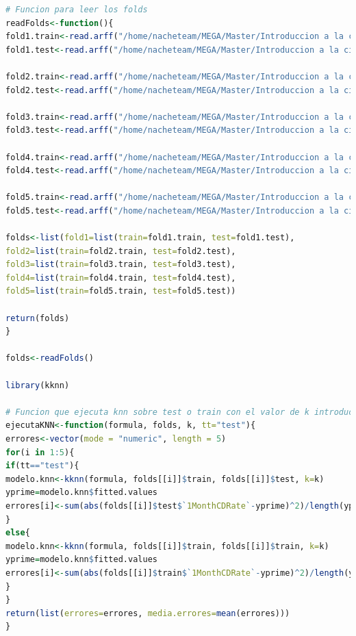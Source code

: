 \documentclass[12pt,a4paper]{article}
\begin{document}
\begin{lstlisting}[basicstyle=\tiny, language=R]
# Funcion para leer los folds
readFolds<-function(){
fold1.train<-read.arff("/home/nacheteam/MEGA/Master/Introduccion a la ciencia de datos/Trabajo Integrador/DATOS/Datasets Regresion/treasury/treasury-5-1tra.dat")
fold1.test<-read.arff("/home/nacheteam/MEGA/Master/Introduccion a la ciencia de datos/Trabajo Integrador/DATOS/Datasets Regresion/treasury/treasury-5-1tst.dat")

fold2.train<-read.arff("/home/nacheteam/MEGA/Master/Introduccion a la ciencia de datos/Trabajo Integrador/DATOS/Datasets Regresion/treasury/treasury-5-2tra.dat")
fold2.test<-read.arff("/home/nacheteam/MEGA/Master/Introduccion a la ciencia de datos/Trabajo Integrador/DATOS/Datasets Regresion/treasury/treasury-5-2tst.dat")

fold3.train<-read.arff("/home/nacheteam/MEGA/Master/Introduccion a la ciencia de datos/Trabajo Integrador/DATOS/Datasets Regresion/treasury/treasury-5-3tra.dat")
fold3.test<-read.arff("/home/nacheteam/MEGA/Master/Introduccion a la ciencia de datos/Trabajo Integrador/DATOS/Datasets Regresion/treasury/treasury-5-3tst.dat")

fold4.train<-read.arff("/home/nacheteam/MEGA/Master/Introduccion a la ciencia de datos/Trabajo Integrador/DATOS/Datasets Regresion/treasury/treasury-5-4tra.dat")
fold4.test<-read.arff("/home/nacheteam/MEGA/Master/Introduccion a la ciencia de datos/Trabajo Integrador/DATOS/Datasets Regresion/treasury/treasury-5-4tst.dat")

fold5.train<-read.arff("/home/nacheteam/MEGA/Master/Introduccion a la ciencia de datos/Trabajo Integrador/DATOS/Datasets Regresion/treasury/treasury-5-5tra.dat")
fold5.test<-read.arff("/home/nacheteam/MEGA/Master/Introduccion a la ciencia de datos/Trabajo Integrador/DATOS/Datasets Regresion/treasury/treasury-5-5tst.dat")

folds<-list(fold1=list(train=fold1.train, test=fold1.test),
fold2=list(train=fold2.train, test=fold2.test),
fold3=list(train=fold3.train, test=fold3.test),
fold4=list(train=fold4.train, test=fold4.test),
fold5=list(train=fold5.train, test=fold5.test))

return(folds)
}

folds<-readFolds()

library(kknn)

# Funcion que ejecuta knn sobre test o train con el valor de k introducido y la formula pasada
ejecutaKNN<-function(formula, folds, k, tt="test"){
errores<-vector(mode = "numeric", length = 5)
for(i in 1:5){
if(tt=="test"){
modelo.knn<-kknn(formula, folds[[i]]$train, folds[[i]]$test, k=k)
yprime=modelo.knn$fitted.values
errores[i]<-sum(abs(folds[[i]]$test$`1MonthCDRate`-yprime)^2)/length(yprime)
}
else{
modelo.knn<-kknn(formula, folds[[i]]$train, folds[[i]]$train, k=k)
yprime=modelo.knn$fitted.values
errores[i]<-sum(abs(folds[[i]]$train$`1MonthCDRate`-yprime)^2)/length(yprime)
}
}
return(list(errores=errores, media.errores=mean(errores)))
}


\end{lstlisting}
\end{document}
